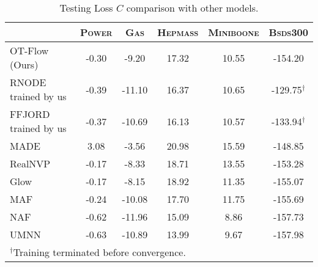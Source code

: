 \documentclass[letterpaper]{article}
\newcommand{\miniboone}{\textsc{Miniboone}}
\newcommand{\power}{\textsc{Power}}
\newcommand{\gas}{\textsc{Gas}}
\newcommand{\hepmass}{\textsc{Hepmass}}
\newcommand{\bsds}{\textsc{Bsds300}}
\newcommand{\model}{OT-Flow} %
\begin{document}
	\begin{table*}
		\centering 
	    \begin{tabular}{lccccc}  
	    \toprule
	                            & \power{} & \gas{} & \hepmass{} & \miniboone{} & \bsds{} \\
	    \midrule
	    \model{} (Ours)  & -0.30 & \hphantom{0}-9.20 & 17.32  & 10.55 & -154.20\hphantom{$^\dagger$}  \\
	    RNODE trained by us  & -0.39 & -11.10 &  16.37 &  10.65  & -129.75$^\dagger$\\
		FFJORD trained by us & -0.37 & -10.69 &  16.13 &  10.57  & -133.94$^\dagger$ \\
		\midrule
		MADE~\cite{germain15}    & \hphantom{-}3.08 & \hphantom{0}-3.56 & 20.98 & 15.59 & -148.85\hphantom{$^\dagger$} \\
		RealNVP~\cite{dinh2016density}	& -0.17 & \hphantom{0}-8.33  & 18.71 & 13.55 & -153.28\hphantom{$^\dagger$} \\
		Glow~\cite{kingma2018glow}			& -0.17 & \hphantom{0}-8.15  & 18.92 & 11.35 & -155.07\hphantom{$^\dagger$} \\
		MAF~\cite{papamakarios2017masked}   & -0.24 & -10.08 & 17.70 & 11.75 & -155.69\hphantom{$^\dagger$} \\
		NAF~\cite{huang2018neural}          & -0.62 & -11.96 & 15.09 & \hphantom{0}8.86 & -157.73\hphantom{$^\dagger$} \\
		UMNN~\cite{wehenkel2019unconstrained} & -0.63 & -10.89 & 13.99 & \hphantom{0}9.67  & -157.98\hphantom{$^\dagger$} \\      
	    \bottomrule
	    \multicolumn{6}{l}{\small{$^\dagger$Training terminated before convergence.}}                                 
	    \end{tabular}
    	\caption{Testing Loss $C$ comparison with other models.}
    	\label{tab:test_loss}
	\end{table*}
\end{document}
